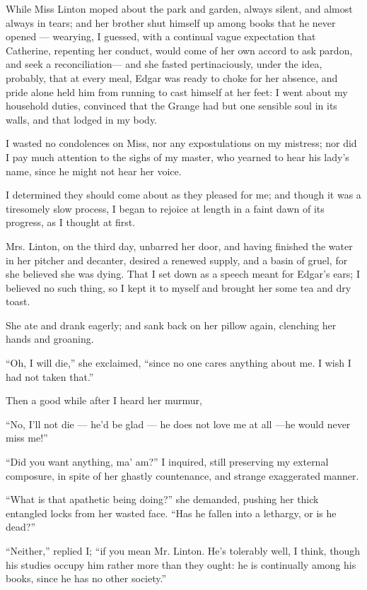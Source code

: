\par While Miss Linton moped about the park and garden, always silent, and almost always in tears; and her brother shut himself up among books that he never opened — wearying, I guessed, with a continual vague expectation that Catherine, repenting her conduct, would come of her own accord to ask pardon, and seek a reconciliation— and she fasted pertinaciously, under the idea, probably, that at every meal, Edgar was ready to choke for her absence, and pride alone held him from running to cast himself at her feet: I went about my household duties, convinced that the Grange had but one sensible soul in its walls, and that lodged in my body.
\par I wasted no condolences on Miss, nor any expostulations on my mistress; nor did I pay much attention to the sighs of my master, who yearned to hear his lady's name, since he might not hear her voice.
\par I determined they should come about as they pleased for me; and though it was a tiresomely slow process, I began to rejoice at length in a faint dawn of its progress, as I thought at first.
\par Mrs. Linton, on the third day, unbarred her door, and having finished the water in her pitcher and decanter, desired a renewed supply, and a basin of gruel, for she believed she was dying. That I set down as a speech meant for Edgar's ears; I believed no such thing, so I kept it to myself and brought her some tea and dry toast.
\par She ate and drank eagerly; and sank back on her pillow again, clenching her hands and groaning.
\par “Oh, I will die,” she exclaimed, “since no one cares anything about me. I wish I had not taken that.”
\par Then a good while after I heard her murmur,
\par “No, I'll not die — he'd be glad — he does not love me at all —he would never miss me!”
\par “Did you want anything, ma' am?” I inquired, still preserving my external composure, in spite of her ghastly countenance, and strange exaggerated manner.
\par “What is that apathetic being doing?” she demanded, pushing her thick entangled locks from her wasted face. “Has he fallen into a lethargy, or is he dead?”
\par “Neither,” replied I; “if you mean Mr. Linton. He's tolerably well, I think, though his studies occupy him rather more than they ought: he is continually among his books, since he has no other society.”
